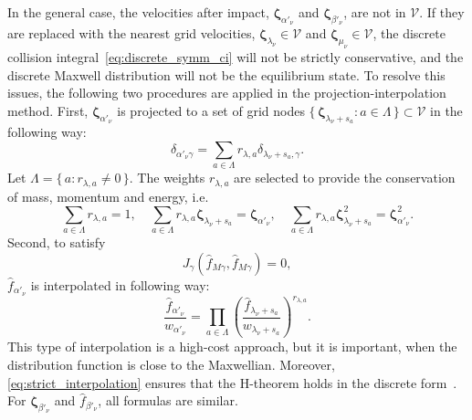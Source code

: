 \documentclass[final]{jfm} %
\newcommand{\bzeta}{\boldsymbol{\zeta}}
\newcommand{\Set}[2]{\{\,{#1}:{#2}\,\}}
\begin{document}
In the general case, the velocities after impact,
\(\bzeta_{\alpha'_\nu}\) and \(\bzeta_{\beta'_\nu}\), are not in \(\mathcal{V}\).
If they are replaced with the nearest grid velocities,
\(\bzeta_{\lambda_\nu}\in\mathcal{V}\) and \(\bzeta_{\mu_\nu}\in\mathcal{V}\),
the discrete collision integral~\eqref{eq:discrete_symm_ci} will not be strictly conservative,
and the discrete Maxwell distribution will not be the equilibrium state.
To resolve this issues, the following two procedures are applied in the projection-interpolation method.
First, \(\bzeta_{\alpha'_\nu}\) is projected to a set of grid nodes
\(\Set{\bzeta_{\lambda_\nu+s_a}}{a\in\Lambda}\subset\mathcal{V}\) in the following way:
\begin{equation}\label{eq:ci_projection}
    \delta_{\alpha'_\nu\gamma} = \sum_{a\in\Lambda} r_{\lambda,a}\delta_{\lambda_\nu+s_a,\gamma}.
\end{equation}
Let \(\Lambda = \Set{a}{r_{\lambda,a}\neq0}\).
The weights \(r_{\lambda,a}\) are selected to provide the conservation of mass, momentum and energy, i.e.
\begin{equation}\label{eq:stencil_conservation}
    \sum_{a\in\Lambda} r_{\lambda,a} = 1, \quad
    \sum_{a\in\Lambda} r_{\lambda,a} \bzeta_{\lambda_\nu+s_a} = \bzeta_{\alpha'_\nu}, \quad
    \sum_{a\in\Lambda} r_{\lambda,a} \bzeta_{\lambda_\nu+s_a}^2 = \bzeta_{\alpha'_\nu}^2.
\end{equation}
Second, to satisfy
\begin{equation}\label{eq:strict_interpolation}
    J_\gamma(\hat{f}_{M\gamma}, \hat{f}_{M\gamma}) = 0,
\end{equation}
\(\hat{f}_{\alpha'_\nu}\) is interpolated in following way:
\begin{equation}\label{eq:ci_interpolation}
    \frac{\hat{f}_{\alpha'_\nu}}{w_{\alpha'_\nu}} = \prod_{a\in\Lambda}
        \left(\frac{\hat{f}_{\lambda_\nu+s_a}}{w_{\lambda_\nu+s_a}} \right)^{r_{\lambda,a}}.
\end{equation}
This type of interpolation is a high-cost approach, but it is important,
when the distribution function is close to the Maxwellian.
Moreover, \eqref{eq:strict_interpolation} ensures that the H-theorem holds in the discrete form~\citep{Dodulad2013}.
For \(\bzeta_{\beta'_\nu}\) and \(\hat{f}_{\beta'_\nu}\), all formulas are similar.
\end{document}
